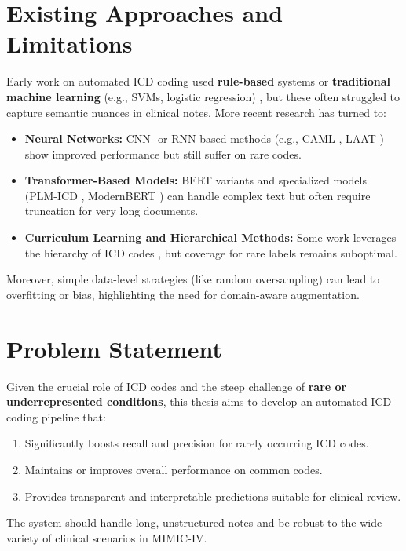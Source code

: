 \documentclass[12pt,a4paper]{report}
\begin{document}
\section{Existing Approaches and Limitations}
Early work on automated ICD coding used \textbf{rule-based} systems \cite{farkas2008automatic} or \textbf{traditional machine learning} (e.g., SVMs, logistic regression) \cite{perotte2014diagnosis}, but these often struggled to capture semantic nuances in clinical notes. More recent research has turned to:
\begin{itemize}
    \item \textbf{Neural Networks:} CNN- or RNN-based methods (e.g., CAML \cite{mullenbach2018explainable}, LAAT \cite{vu2020label}) show improved performance but still suffer on rare codes.
    \item \textbf{Transformer-Based Models:} BERT variants \cite{devlin2019bert} and specialized models (PLM-ICD \cite{huang2022plm}, ModernBERT \cite{warner2024modernbert}) can handle complex text but often require truncation for very long documents.
    \item \textbf{Curriculum Learning and Hierarchical Methods:} Some work leverages the hierarchy of ICD codes \cite{ren2022hicu}, but coverage for rare labels remains suboptimal.
\end{itemize}
Moreover, simple data-level strategies (like random oversampling) can lead to overfitting or bias, highlighting the need for domain-aware augmentation.

\section{Problem Statement}
Given the crucial role of ICD codes and the steep challenge of \textbf{rare or underrepresented conditions}, this thesis aims to develop an automated ICD coding pipeline that:
\begin{enumerate}
    \item Significantly boosts recall and precision for rarely occurring ICD codes.
    \item Maintains or improves overall performance on common codes.
    \item Provides transparent and interpretable predictions suitable for clinical review.
\end{enumerate}
The system should handle long, unstructured notes and be robust to the wide variety of clinical scenarios in MIMIC-IV.
\end{document}
